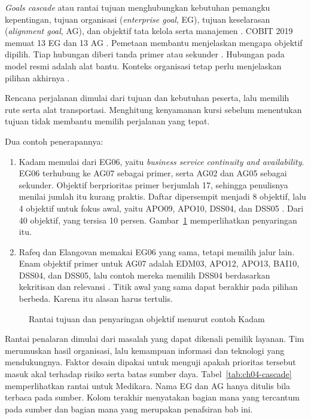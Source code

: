 \textit{Goals cascade} atau rantai tujuan menghubungkan kebutuhan pemangku kepentingan, tujuan organisasi
(\textit{enterprise goal}, EG), tujuan keselarasan (\textit{alignment goal}, AG), dan objektif tata kelola serta manajemen
\cite{c04-routsis,c04-sistematis}. COBIT 2019 memuat 13 EG dan 13 AG \cite{c04-strategi,c04-transformasi}. Pemetaan membantu
menjelaskan mengapa objektif dipilih. Tiap hubungan diberi tanda primer atau sekunder \cite{c04-kontinuitas}. Hubungan pada model
resmi adalah alat bantu. Konteks organisasi tetap perlu menjelaskan pilihan akhirnya \cite{c04-kontinuitas,c04-sistematis}.

Rencana perjalanan dimulai dari tujuan dan kebutuhan peserta, lalu memilih rute serta alat transportasi. Menghitung kenyamanan
kursi sebelum menentukan tujuan tidak membantu memilih perjalanan yang tepat.

Dua contoh penerapannya:
\begin{enumerate}
  \item Kadam memulai dari EG06, yaitu \textit{business service continuity and availability}. EG06 terhubung ke AG07 sebagai
  primer, serta AG02 dan AG05 sebagai sekunder. Objektif berprioritas primer berjumlah 17, sehingga penulisnya menilai jumlah
  itu kurang praktis. Daftar dipersempit menjadi 8 objektif, lalu 4 objektif untuk fokus awal, yaitu APO09, APO10, DSS04, dan
  DSS05 \cite{c04-kontinuitas}. Dari 40 objektif, yang tersisa 10 persen. Gambar~\ref{fig:ch04-rantai-tujuan} memperlihatkan
  penyaringan itu.
  \item Rafeq dan Elangovan memakai EG06 yang sama, tetapi memilih jalur lain. Enam objektif primer untuk AG07 adalah EDM03,
  APO12, APO13, BAI10, DSS04, dan DSS05, lalu contoh mereka memilih DSS04 berdasarkan kekritisan dan relevansi
  \cite{c04-sistematis}. Titik awal yang sama dapat berakhir pada pilihan berbeda. Karena itu alasan harus tertulis.
\end{enumerate}

\begin{figure}[!htb]
  \centering
  
  \caption{Rantai tujuan dan penyaringan objektif menurut contoh Kadam}
  \label{fig:ch04-rantai-tujuan}
\end{figure}

Rantai penalaran dimulai dari masalah yang dapat dikenali pemilik layanan. Tim merumuskan hasil organisasi, lalu kemampuan
informasi dan teknologi yang mendukungnya. Faktor desain dipakai untuk menguji apakah prioritas tersebut masuk akal terhadap
risiko serta batas sumber daya. Tabel~\ref{tab:ch04-cascade} memperlihatkan rantai untuk Medikara. Nama EG dan AG hanya ditulis
bila terbaca pada sumber. Kolom terakhir menyatakan bagian mana yang tercantum pada sumber dan bagian mana yang merupakan
penafsiran bab ini.


